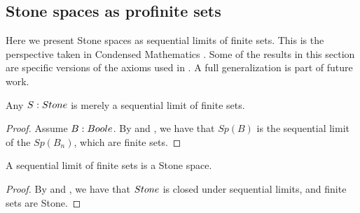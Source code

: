 
\subsection{Stone spaces as profinite sets}
Here we present Stone spaces as sequential limits of finite sets. 
This is the perspective taken in Condensed Mathematics \cite{Condensed,Dagur,Scholze}.
Some of the results in this section are specific versions of the axioms used in 
\cite{bc24}. A full generalization is part of future work. 

\begin{lemma}
  Any $S:\Stone$ is merely a sequential limit of finite sets. 
\end{lemma}
\begin{proof}
  Assume $B:\Boole$. By  and , %
 we have that $Sp(B)$ is the sequential limit of the $Sp(B_n)$, which are finite sets. 
\end{proof}

\begin{lemma}\label{StoneAreProfinite}
  A sequential limit of finite sets is a Stone space. 
\end{lemma}
\begin{proof}
  By  and %
  , 
  we have that $\Stone$ is closed under sequential limits, and finite sets are Stone.
\end{proof}

